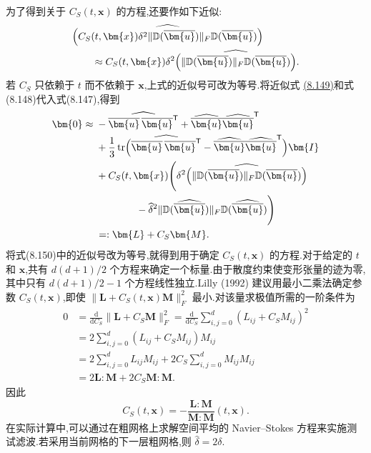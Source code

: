 \begin{note}[动态 Smagorinsky 模型]
为了得到关于 $C_S(t,\bm{x})$ 的方程,还要作如下近似:
\begin{equation}\label{eq:dynamic-smagorinsky-commutation-approx}
\begin{aligned}
&\widehat{\Bigl(
 C_S(t,\bm{x})\delta^2
 \|\mathbb{D}(\overline{\bm{u}})\|_F
 \mathbb{D}(\overline{\bm{u}})\Bigr)}\\
&\qquad\approx C_S(t,\bm{x})\delta^2
 \widehat{\Bigl(
 \|\mathbb{D}(\overline{\bm{u}})\|_F
 \mathbb{D}(\overline{\bm{u}})\Bigr)}.
\end{aligned}
\end{equation}
若 $C_S$ 只依赖于 $t$ 而不依赖于 $\bm{x}$,上式的近似号可改为等号.将近似式
\hyperref[eq:dynamic-smagorinsky-commutation-approx]{(8.149)}和式(8.148)代入式(8.147),得到
\begin{equation}\label{eq:dynamic-smagorinsky-leonard-model}
\begin{aligned}
\bm{0}\approx{}&
 -\widehat{\overline{\bm{u}}\,\overline{\bm{u}}^{\mathsf T}}
 +\widehat{\overline{\bm{u}}}
   \widehat{\overline{\bm{u}}}^{\mathsf T}\\
&+\frac13\operatorname{tr}\Bigl(
 \widehat{\overline{\bm{u}}\,\overline{\bm{u}}^{\mathsf T}}
 -\widehat{\overline{\bm{u}}}
  \widehat{\overline{\bm{u}}}^{\mathsf T}\Bigr)\bm{I}\\
&+C_S(t,\bm{x})\Biggl(
 \delta^2\widehat{\Bigl(
  \|\mathbb{D}(\overline{\bm{u}})\|_F
  \mathbb{D}(\overline{\bm{u}})\Bigr)}\\
&\qquad\qquad-\widehat\delta^2
 \|\mathbb{D}(\widehat{\overline{\bm{u}}})\|_F
 \mathbb{D}(\widehat{\overline{\bm{u}}})\Biggr)\\
&=:\bm{L}+C_S\bm{M}.
\end{aligned}
\end{equation}
将式(8.150)中的近似号改为等号,就得到用于确定 $C_S(t,\bm{x})$ 的方程.对于给定的 $t$ 和 $\bm{x}$,共有 $d(d+1)/2$ 个方程来确定一个标量.由于散度约束使变形张量的迹为零,其中只有 $d(d+1)/2-1$ 个方程线性独立.Lilly (1992) 建议用最小二乘法确定参数 $C_S(t,\bm{x})$,即使 $\|\bm{L}+C_S(t,\bm{x})\bm{M}\|_F^2$ 最小.对该量求极值所需的一阶条件为
\[
\begin{aligned}
0&=\frac{\mathrm{d}}{\mathrm{d}C_S}
   \|\bm{L}+C_S\bm{M}\|_F^2
 =\frac{\mathrm{d}}{\mathrm{d}C_S}
   \sum_{i,j=0}^d(L_{ij}+C_SM_{ij})^2\\
&=2\sum_{i,j=0}^d(L_{ij}+C_SM_{ij})M_{ij}\\
&=2\sum_{i,j=0}^dL_{ij}M_{ij}
 +2C_S\sum_{i,j=0}^dM_{ij}M_{ij}\\
&=2\bm{L}:\bm{M}
 +2C_S\bm{M}:\bm{M}.
\end{aligned}
\]
因此
\begin{equation}\label{eq:dynamic-smagorinsky-coefficient}
C_S(t,\bm{x})
=-\frac{\bm{L}:\bm{M}}{\bm{M}:\bm{M}}(t,\bm{x}).
\end{equation}
在实际计算中,可以通过在粗网格上求解空间平均的 Navier--Stokes 方程来实施测试滤波.若采用当前网格的下一层粗网格,则 $\widehat\delta=2\delta$.


\end{note}
